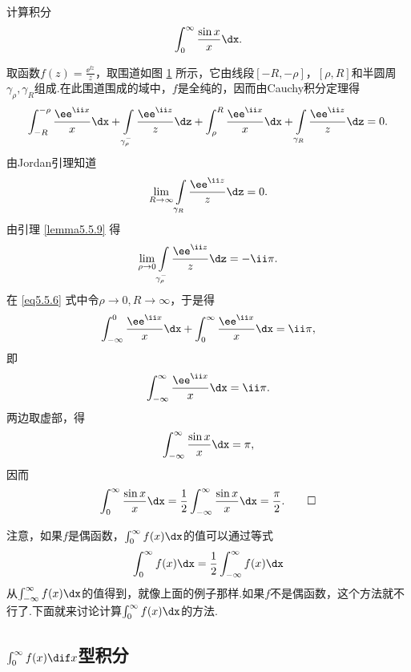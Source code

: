 \begin{example}\label{exam5.5.10}
计算积分
\[\int_0^\infty\frac{\sin x}x\dx.\]
\end{example}
\begin{figure}[!ht]
\centering
{}
\caption{\label{fig5.3}}
\end{figure}
\begin{solution}
取函数$f(z)=\frac{\ee^{\ii z}}z$，取围道如图 \ref{fig5.3} 所示，它由线段$[-R,-\rho]$，$[\rho,R]$和半圆周$\gamma_\rho,\gamma_R$组成.在此围道围成的域中，$f$是全纯的，因而由Cauchy积分定理得
\begin{equation}\label{eq5.5.6}
\int_{-R}^{-\rho}\frac{\ee^{\ii x}}x\dx+\int\limits_{\gamma_\rho^-}\frac{\ee^{\ii z}}z\dz+\int_\rho^R\frac{\ee^{\ii x}}x\dx+\int\limits_{\gamma_R}\frac{\ee^{\ii z}}z\dz=0.
\end{equation}
由Jordan引理知道
\[\lim_{R\to\infty}\int\limits_{\gamma_R}\frac{\ee^{\ii z}}z\dz=0.\]
由引理 \ref{lemma5.5.9} 得
\[\lim_{\rho\to0}\int\limits_{\gamma_\rho^-}\frac{\ee^{\ii z}}z\dz=-\ii\pi.\]
在 \eqref{eq5.5.6} 式中令$\rho\to0,R\to\infty$，于是得
\[\int_{-\infty}^0\frac{\ee^{\ii x}}x\dx+\int_0^\infty\frac{\ee^{\ii x}}x\dx=\ii\pi,\]
即
\[\int_{-\infty}^\infty\frac{\ee^{\ii x}}x\dx=\ii\pi.\]
两边取虚部，得
\[\int_{-\infty}^\infty\frac{\sin x}x\dx=\pi,\]
因而
\begin{equation*}
  \int_0^\infty\frac{\sin x}x\dx = \frac12\int_{-\infty}^\infty\frac{\sin x}x\dx = \frac\pi2. \qedhere
\end{equation*}
\end{solution}

注意，如果$f$是偶函数，$\int_0^\infty f(x)\dx$的值可以通过等式
\[\int_0^\infty f(x)\dx=\frac12\int_{-\infty}^\infty f(x)\dx\]
从$\int_{-\infty}^\infty f(x)\dx$的值得到，就像上面的例子那样.如果$f$不是偶函数，这个方法就不行了.下面就来讨论计算$\int_0^\infty f(x)\dx$的方法.

\subsection{\mbox{$\int_0^\infty f(x){\normalfont\dif }x$}型积分\protect\hypertarget{sec5.5.2}{}}

